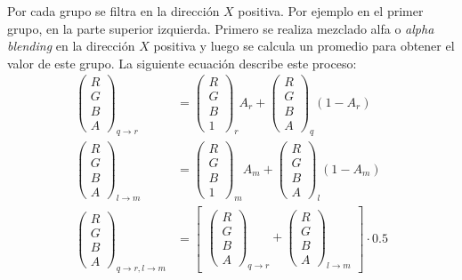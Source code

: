 Por cada grupo se filtra en la dirección $X$ positiva. Por ejemplo en el primer grupo, en la parte superior izquierda. Primero se realiza mezclado alfa o \emph{alpha blending} en la dirección $X$ positiva y luego se calcula un promedio para obtener el valor de este grupo. La siguiente ecuación describe este proceso:
\smallskip
\begin{equation}
\begin{split}
	\begin{pmatrix}R\\G\\B\\A\end{pmatrix}_{q \to r} &= 
	\begin{pmatrix}R\\G\\B\\1\end{pmatrix}_{r}A_{r} +
	\begin{pmatrix}R\\G\\B\\A\end{pmatrix}_{q}(1-A_{r})\\
	\begin{pmatrix}R\\G\\B\\A\end{pmatrix}_{l \to m} &= 
	\begin{pmatrix}R\\G\\B\\1\end{pmatrix}_{m}A_{m} +
	\begin{pmatrix}R\\G\\B\\A\end{pmatrix}_{l}(1-A_{m})\\
	\begin{pmatrix}R\\G\\B\\A\end{pmatrix}_{q \to r, l \to m} &= 
	\begin{bmatrix}
	\begin{pmatrix}R\\G\\B\\A\end{pmatrix}_{q \to r} +
	\begin{pmatrix}R\\G\\B\\A\end{pmatrix}_{l \to m}
	\end{bmatrix}\cdot 0.5
\end{split}
\end{equation}

